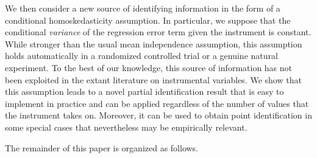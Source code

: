 We then consider a new source of identifying information in the form of a conditional homoskedasticity assumption. 
In particular, we suppose that the conditional \emph{variance} of the regression error term given the instrument is constant.
While stronger than the usual mean independence assumption, this assumption holds automatically in a randomized controlled trial or a genuine natural experiment. 
To the best of our knowledge, this source of information has not been exploited in the extant literature on instrumental variables.  
We show that this assumption leads to a novel partial identification result that is easy to implement in practice and can be applied regardless of the number of values that the instrument takes on.
Moreover, it can be used to obtain point identification in some special cases that nevertheless may be empirically relevant. 

The remainder of this paper is organized as follows.


 


